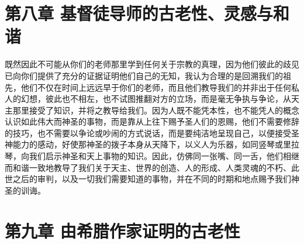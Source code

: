 
\section{第八章 基督徒导师的古老性、灵感与和谐}

既然因此不可能从你们的老师那里学到任何关于宗教的真理，因为他们彼此的歧见已向你们提供了充分的证据证明他们自己的无知，我认为合理的是回溯我们的祖先，他们不仅在时间上远远早于你们的老师，而且他们教导我们的并非出于任何私人的幻想，彼此也不相左，也不试图推翻对方的立场，而是毫无争执与争论，从天主那里接受了知识，并将之教导给我们。因为人既不能凭本性，也不能凭人的概念认识如此伟大而神圣的事物，而是靠从上往下赐予圣人们的恩赐，他们不需要修辞的技巧，也不需要以争论或吵闹的方式说话，而是要纯洁地呈现自己，以便接受圣神能力的感动，好使那神圣的拨子本身从天降下，以义人为乐器，如同竖琴或里拉琴，向我们启示神圣和天上事物的知识。因此，仿佛同一张嘴、同一舌，他们相继而和谐一致地教导了我们关于天主、世界的创造、人的形成、人类灵魂的不朽、此世之后的审判，以及一切我们需要知道的事物，并在不同的时期和地点赐予我们神圣的训诲。\par


\section{第九章 由希腊作家证明的古老性}

